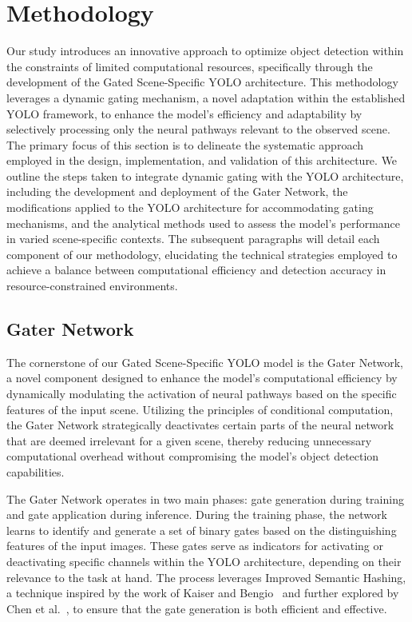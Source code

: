 \section{Methodology} 

Our study introduces an innovative approach to optimize object detection within the constraints of limited computational resources, specifically through the development of the Gated Scene-Specific YOLO architecture. This methodology leverages a dynamic gating mechanism, a novel adaptation within the established YOLO framework, to enhance the model's efficiency and adaptability by selectively processing only the neural pathways relevant to the observed scene. The primary focus of this section is to delineate the systematic approach employed in the design, implementation, and validation of this architecture. We outline the steps taken to integrate dynamic gating with the YOLO architecture, including the development and deployment of the Gater Network, the modifications applied to the YOLO architecture for accommodating gating mechanisms, and the analytical methods used to assess the model's performance in varied scene-specific contexts. The subsequent paragraphs will detail each component of our methodology, elucidating the technical strategies employed to achieve a balance between computational efficiency and detection accuracy in resource-constrained environments.

\subsection{Gater Network}
The cornerstone of our Gated Scene-Specific YOLO model is the Gater Network, a novel component designed to enhance the model's computational efficiency by dynamically modulating the activation of neural pathways based on the specific features of the input scene. Utilizing the principles of conditional computation, the Gater Network strategically deactivates certain parts of the neural network that are deemed irrelevant for a given scene, thereby reducing unnecessary computational overhead without compromising the model's object detection capabilities.

The Gater Network operates in two main phases: gate generation during training and gate application during inference. During the training phase, the network learns to identify and generate a set of binary gates based on the distinguishing features of the input images. These gates serve as indicators for activating or deactivating specific channels within the YOLO architecture, depending on their relevance to the task at hand. The process leverages Improved Semantic Hashing, a technique inspired by the work of Kaiser and Bengio~\cite{kaiser2018discrete} and further explored by Chen et al.~\cite{chen2019you}, to ensure that the gate generation is both efficient and effective.


